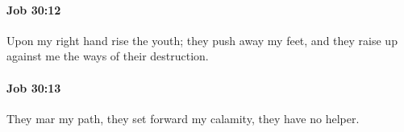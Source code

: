 		\paragraph{Job 30:12} %
			\label{JOB-30-12}

			Upon my right hand rise the youth; they push away my feet, and they raise up against me the ways of their destruction.


		\paragraph{Job 30:13} %
			\label{JOB-30-13}

			They mar my path, they set forward my calamity, they have no helper.


